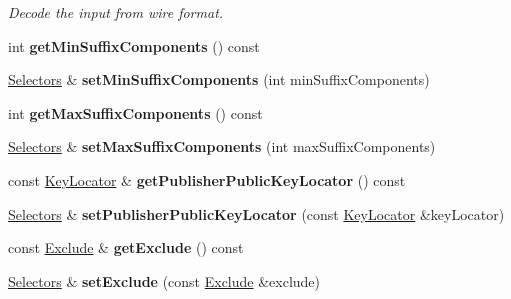 \begin{DoxyCompactItemize}
\begin{DoxyCompactList}\small\item\em Decode the input from wire format. \end{DoxyCompactList}\item 
int {\bfseries get\+Min\+Suffix\+Components} () const\hypertarget{classndn_1_1Selectors_a62efc57699b8a47454ee5f87c93fe1e6}{}\label{classndn_1_1Selectors_a62efc57699b8a47454ee5f87c93fe1e6}

\item 
\hyperlink{classndn_1_1Selectors}{Selectors} \& {\bfseries set\+Min\+Suffix\+Components} (int min\+Suffix\+Components)\hypertarget{classndn_1_1Selectors_a8d19afca54a41834dac16cf3e15045e3}{}\label{classndn_1_1Selectors_a8d19afca54a41834dac16cf3e15045e3}

\item 
int {\bfseries get\+Max\+Suffix\+Components} () const\hypertarget{classndn_1_1Selectors_a21b4aeb2739382acfe209ab82b17d2f7}{}\label{classndn_1_1Selectors_a21b4aeb2739382acfe209ab82b17d2f7}

\item 
\hyperlink{classndn_1_1Selectors}{Selectors} \& {\bfseries set\+Max\+Suffix\+Components} (int max\+Suffix\+Components)\hypertarget{classndn_1_1Selectors_a4438fca5794d4c23b4f9a0ed93f4f781}{}\label{classndn_1_1Selectors_a4438fca5794d4c23b4f9a0ed93f4f781}

\item 
const \hyperlink{classndn_1_1KeyLocator}{Key\+Locator} \& {\bfseries get\+Publisher\+Public\+Key\+Locator} () const\hypertarget{classndn_1_1Selectors_ae7b9afd0ae86071eaa6ceadab00eee89}{}\label{classndn_1_1Selectors_ae7b9afd0ae86071eaa6ceadab00eee89}

\item 
\hyperlink{classndn_1_1Selectors}{Selectors} \& {\bfseries set\+Publisher\+Public\+Key\+Locator} (const \hyperlink{classndn_1_1KeyLocator}{Key\+Locator} \&key\+Locator)\hypertarget{classndn_1_1Selectors_a66063d155afebfea3bd72cc85cd5322a}{}\label{classndn_1_1Selectors_a66063d155afebfea3bd72cc85cd5322a}

\item 
const \hyperlink{classndn_1_1Exclude}{Exclude} \& {\bfseries get\+Exclude} () const\hypertarget{classndn_1_1Selectors_ade7caf557685724a33f56f05be286a97}{}\label{classndn_1_1Selectors_ade7caf557685724a33f56f05be286a97}

\item 
\hyperlink{classndn_1_1Selectors}{Selectors} \& {\bfseries set\+Exclude} (const \hyperlink{classndn_1_1Exclude}{Exclude} \&exclude)\hypertarget{classndn_1_1Selectors_a3368c3ec702d9ed2704d8118b1caf9e9}{}\label{classndn_1_1Selectors_a3368c3ec702d9ed2704d8118b1caf9e9}


\end{DoxyCompactItemize}
